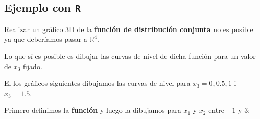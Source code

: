 \documentclass[]{book}
\begin{document}
\hypertarget{ejemplo-con-r}{%
\subsection{\texorpdfstring{Ejemplo con \texttt{R}}{Ejemplo con R}}\label{ejemplo-con-r}}

Realizar un gráfico 3D de la \textbf{función de distribución conjunta} no es posible ya que deberíamos pasar a \(\mathbb{R}^4\).

Lo que sí es posible es dibujar las curvas de nivel de dicha función para un valor de \(x_3\) fijado.

El los gráficos siguientes dibujamos las curvas de nivel para \(x_3=0,0.5,1\) i \(x_3=1.5\).

Primero definimos la \textbf{función} y luego la dibujamos para \(x_1\) y \(x_2\) entre \(-1\) y \(3\):
\end{document}

